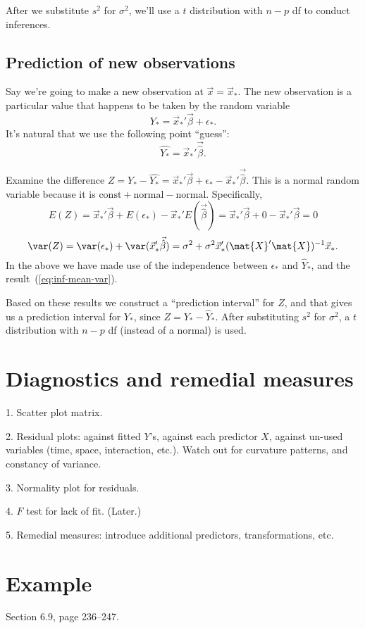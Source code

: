 \documentclass[12pt]{article}
\begin{document}
After we substitute $s^2$ for $\sigma^2$,
we'll use a $t$ distribution with $n-p$ df to conduct inferences.

\subsection{Prediction of new observations}

Say we're going to make a new observation at $\vec{x} = \vec{x}_*$.
The new observation is a particular value that happens to be taken
by the random variable
\[
Y_* = \vec{x}_*' \vec{\beta} + \epsilon_*
.
\]
It's natural that we use the following point ``guess'':
\[
\hat{Y_*} = \vec{x}_*' \vec{\hat\beta}
.
\]

Examine the difference
$Z
= Y_* - \hat{Y_*}
= \vec{x}_*'\vec{\beta} + \epsilon_* - \vec{x}_*'\vec{\hat\beta}$.
This is a normal random variable because
it is $\text{const} + \text{normal} - \text{normal}$.
Specifically,
\[
E(Z)
= \vec{x}_*'\vec{\beta} + E(\epsilon_*) - \vec{x}_*'E(\vec{\hat\beta})
= \vec{x}_*'\vec{\beta} + 0 - \vec{x}_*'\vec{\beta}
= 0
\]
\[
\var(Z)
= \var(\epsilon_*) + \var(\vec{x}_*'\vec{\hat\beta})
= \sigma^2 + \sigma^2 \vec{x}_*' (\mat{X}'\mat{X})^{-1}\vec{x}_*
.
\]
In the above we have made use of the independence between
$\epsilon_*$ and $\hat{Y}_*$,
and the result~(\ref{eq:inf-mean-var}).

Based on these results we construct a ``prediction interval''
for $Z$, and that gives us a prediction interval for
$Y_*$, since $Z = Y_* - \hat{Y}_*$.
After substituting $s^2$ for $\sigma^2$,
a $t$ distribution with $n-p$ df (instead of a normal) is used.


\section{Diagnostics and remedial measures}

1. Scatter plot matrix.

2. Residual plots: against fitted $Y$'s, against each predictor $X$,
    against un-used variables (time, space, interaction, etc.).
    Watch out for curvature patterns, and constancy of variance.

3. Normality plot for residuals.

4. $F$ test for lack of fit. (Later.)

5. Remedial measures: introduce additional predictors,
    transformations, etc.

\section{Example}

Section 6.9, page 236--247.
\end{document}
